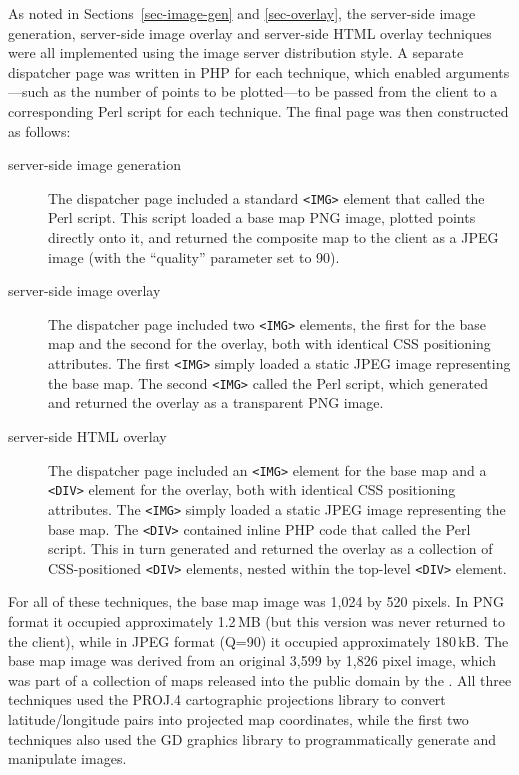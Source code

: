 \documentclass[acmnow]{acmtrans2m}
\begin{document}
As noted in Sections~\ref{sec-image-gen} and \ref{sec-overlay}, the
server-side image generation, server-side image overlay and server-side
HTML overlay techniques were all implemented using the image server
distribution style. A separate dispatcher page was written in PHP for
each technique, which enabled arguments---such as the number of points
to be plotted---to be passed from the client to a corresponding Perl
script for each technique. The final page was then constructed as
follows:
\begin{description}

	\item[server-side image generation] The dispatcher page included a
	standard \verb|<IMG>| element that called the Perl script. This
	script loaded a base map PNG image, plotted points directly onto it,
	and returned the composite map to the client as a JPEG image (with
	the ``quality'' parameter set to 90).

	\item[server-side image overlay] The dispatcher page included two
	\verb|<IMG>| elements, the first for the base map and the second for
	the overlay, both with identical CSS positioning attributes. The
	first \verb|<IMG>| simply loaded a static JPEG image representing
	the base map. The second \verb|<IMG>| called the Perl script, which
	generated and returned the overlay as a transparent PNG image.

	\item[server-side HTML overlay] The dispatcher page included an
	\verb|<IMG>| element for the base map and a \verb|<DIV>| element for
	the overlay, both with identical CSS positioning attributes. The
	\verb|<IMG>| simply loaded a static JPEG image representing the base
	map. The \verb|<DIV>| contained inline PHP code that called the Perl
	script. This in turn generated and returned the overlay as a
	collection of CSS-positioned \verb|<DIV>| elements, nested within
	the top-level \verb|<DIV>| element.

\end{description}

For all of these techniques, the base map image was 1,024 by 520 pixels.
In PNG format it occupied approximately 1.2\,MB (but this version was
never returned to the client), while in JPEG format (Q=90) it occupied
approximately 180\,kB. The base map image was derived from an original
3,599 by 1,826 pixel image, which was part of a collection of maps
released into the public domain by the . All three
techniques used the PROJ.4 cartographic projections library to convert
latitude/longitude pairs into projected map coordinates, while the first
two techniques also used the GD graphics library to programmatically
generate and manipulate images.
\end{document}
